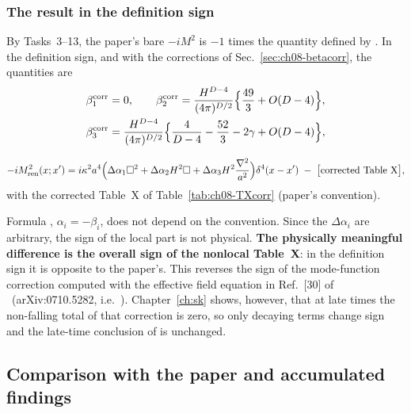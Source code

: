 \subsubsection{The result in the definition sign}
By Tasks~3--13, the paper's bare $-iM^2$ is $-1$ times the quantity defined by .
In the definition sign, and with the corrections of Sec.~\ref{sec:ch08-betacorr}, the quantities are
\begin{equation}
\begin{aligned}
&\beta_1^{\rm corr}=0,\qquad \beta_2^{\rm corr}=\frac{H^{D-4}}{(4\pi)^{D/2}}\Big\{\frac{49}3+O(D-4)\Big\},\\
&\beta_3^{\rm corr}=\frac{H^{D-4}}{(4\pi)^{D/2}}\Big\{\frac{4}{D-4}-\frac{52}3-2\gamma+O(D-4)\Big\},
\end{aligned}
\label{eq:ch08-betadef}
\end{equation}
\begin{resultbox}
\begin{equation}
-iM^2_{\rm ren}(x;x')=i\kappa^2a^4\Big(\Delta\alpha_1\square^2+\Delta\alpha_2H^2\square+\Delta\alpha_3H^2\frac{\nabla^2}{a^2}\Big)\delta^4(x-x')\;-\;\big[\text{corrected Table X}\big],
\label{eq:ch08-final}
\end{equation}
with the corrected Table~X of Table~\ref{tab:ch08-TXcorr} (paper's convention).
\end{resultbox}
Formula , $\alpha_i=-\beta_i$, does not depend on the convention. Since the $\Delta\alpha_i$ are arbitrary, the sign of the local part is not physical.
\textbf{The physically meaningful difference is the overall sign of the nonlocal Table~X}: in the definition sign it is opposite to the paper's.
This reverses the sign of the mode-function correction computed with the effective field equation  in Ref.~[30] of \PI\ (arXiv:0710.5282, i.e.\ \PII).
Chapter~\ref{ch:sk} shows, however, that at late times the non-falling total of that correction is zero, so only decaying terms change sign and the
late-time conclusion of \PII{} is unchanged.

\subsection{Comparison with the paper and accumulated findings}

